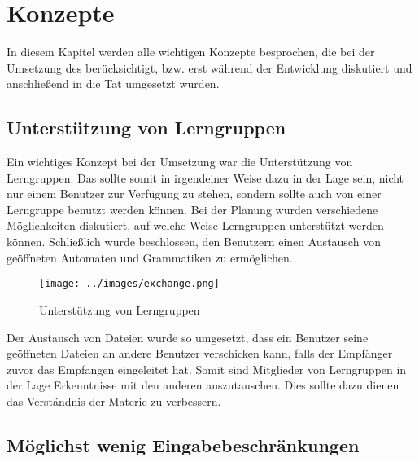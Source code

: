 

\chapter{Konzepte}\label{Concepts}

In diesem Kapitel werden alle wichtigen Konzepte besprochen, die bei der
Umsetzung des \gtitools berücksichtigt, bzw. erst während der Entwicklung
diskutiert und anschließend in die Tat umgesetzt wurden.\vspace{10pt}


\section{Unterstützung von Lerngruppen}

Ein wichtiges Konzept bei der Umsetzung war die Unterstützung von Lerngruppen.
Das \gtitool sollte somit in irgendeiner Weise dazu in der Lage sein, nicht nur
einem Benutzer zur Verfügung zu stehen, sondern sollte auch von einer
Lerngruppe benutzt werden können. Bei der Planung wurden verschiedene
Möglichkeiten diskutiert, auf welche Weise Lerngruppen unterstützt werden
können. Schließlich wurde beschlossen, den Benutzern einen Austausch von
geöffneten Automaten und Grammatiken zu ermöglichen.\vspace{10pt}

\begin{figure}[h!]
\begin{center}
\texttt{[image: ../images/exchange.png]}
\caption{Unterstützung von Lerngruppen}
\end{center}
\end{figure}
\vspace{10pt}

Der Austausch von Dateien wurde so umgesetzt, dass ein Benutzer seine
geöffneten Dateien an andere Benutzer verschicken kann, falls der Empfänger
zuvor das Empfangen eingeleitet hat. Somit sind Mitglieder von Lerngruppen in
der Lage Erkenntnisse mit den anderen auszutauschen. Dies sollte dazu dienen
das Verständnis der Materie zu verbessern.\vspace{10pt}


\section{Möglichst wenig Eingabebeschränkungen}

